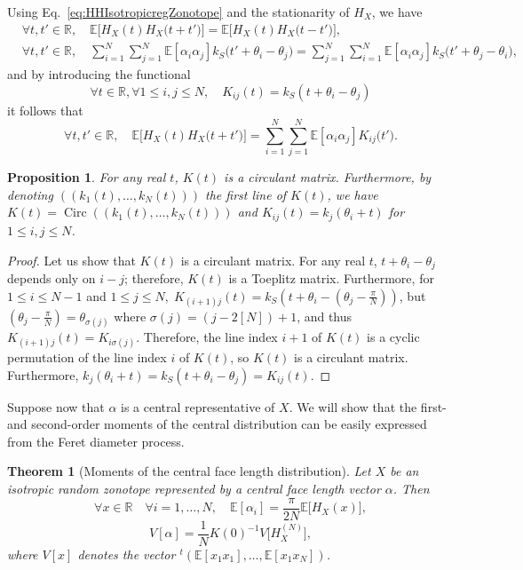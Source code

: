 \documentclass[numbers,compress,v1.0.1]{vmsta}
\newtheorem{theorem}{Theorem}
\newtheorem{proposition}{Proposition}
\theoremstyle{definition}
\begin{document}
Using Eq.~\eqref{eq:HHIsotropicregZonotope} and the stationarity of
$H_{X}$, we have
%
\begin{align}
&\forall t,t'\in\mathbb{R},\quad \mathbb{E}\bigl[ H_{X}(t)
H_{X}\bigl(t+t'\bigr)\bigr]=\mathbb {E}\bigl[
H_{X}(t) H_{X}\bigl(t-t'\bigr)\bigr],
\\
&\forall t,t'\in\mathbb{R},\quad  \sum_{i=1}^N
\sum_{j=1}^N \mathbb{E}[
\alpha_i\alpha_j]k_S\bigl(t'+
\theta_i -\theta_j\bigr)=\sum
_{j=1}^N \sum_{i=1}^N
\mathbb{E}[ \alpha_i\alpha_j]k_S
\bigl(t'+\theta_j -\theta_i\bigr),
\end{align}
%
and by introducing the functional
%
\begin{equation}
\forall t\in\mathbb{R},\forall1\leq i,j\leq N,\quad  K_{ij}(t)=k_S(t+
\theta _i -\theta_j)
\end{equation}
%
it follows that
%
\begin{equation}
\forall t,t'\in\mathbb{R},\quad \mathbb{E}\bigl[ H_{X}(t)
H_{X}\bigl(t+t'\bigr)\bigr]=\sum
_{i=1}^N\sum_{j=1}^N
\mathbb{E}[ \alpha_i\alpha_j]K_{ij}
\bigl(t'\bigr).
\end{equation}
%
\begin{proposition}
For any real $t$, $K(t)$ is a circulant matrix. Furthermore, by
denoting $((k_1(t),\dots,k_{N}(t)))$ the first line of $K(t)$, we have
$K(t)=\operatorname{Circ}((k_1(t),\dots,k_{N}(t)))$ and $K_{ij}(t)=k_j(\theta_i+t)$
for $1\leq i,j\leq N$.
\label{prop:propmatriceKt}
\end{proposition}

\begin{proof}
Let us show that $K(t)$ is a circulant matrix. For any real $t$,
$t+\theta_i -\theta_j$ depends only on $ i-j$; therefore, $K(t)$ is a
Toeplitz matrix. Furthermore, for $1\leq i\leq N-1$ and $1\leq j\leq
N,\;K_{(i+1)j}(t)=k_S(t+\theta_i-(\theta_j-\frac{\pi}{N}))$, but
$(\theta_j-\frac{\pi}{N})=\theta_{\sigma(j)}$ where $\sigma
(j)=(j-2[N])+1$, and thus $K_{(i+1)j}(t)=K_{i\sigma(j)}$. Therefore,
the line index $i+1$ of $K(t)$ is a cyclic permutation of the line
index $i$ of $K(t)$, so $K(t)$ is a circulant matrix. Furthermore,
$k_{j}(\theta_{i}+t)=k_{S}(t+\theta_i-\theta_j)=K_{ij}(t)$.
\end{proof}

Suppose now that $\alpha$ is a central representative of $X$. We will
show that the first- and second-order moments of the central
distribution can be easily expressed from the Feret diameter process.

\begin{theorem}[Moments of the central face length distribution]
Let $X$ be an isotropic random zonotope represented by a central face
length vector $\alpha$. Then
%
\begin{equation}
\forall x\in\mathbb{R}\quad \forall i=1,\dots,N,\quad  \mathbb{E}[\alpha _i]=\frac{\pi}{2N}\mathbb{E}\bigl[H_{X}(x)\bigr],
\end{equation}
%
\begin{equation}
V[\alpha]=\frac{1}{N}K(0)^{-1} V\bigl[H^{(N)}_{X}
\bigr], \label{eq:systemlineaireHHtoalpha}
\end{equation}
%
where $V[x]$ denotes the vector $^t(\mathbb{E}[x_1 x_1],\dots,\mathbb
{E}[x_1 x_N])$.
\end{theorem}
\end{document}
